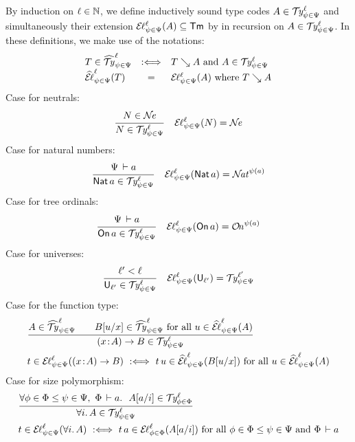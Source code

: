 \documentclass[acmsmall,screen]{acmart}\settopmatter{}
\renewcommand{\forallT}[2]{\forall #1.\,#2}
\begin{document}
By induction on $\ell \in \mathbb{N}$, we define inductively sound type codes
$A \in \mathcal{T}\kern-0.4ex\mathit{y}^{\ell}_{\psi\in\Psi}$ and simultaneously their extension
$\mathcal{E}\kern-0.2ex\ell^{\ell}_{\psi\in\Psi}(A) \subseteq \mathsf{Tm}$ by in recursion on
$A \in \mathcal{T}\kern-0.4ex\mathit{y}^{\ell}_{\psi\in\Psi}$.
In these definitions, we make use of the notations:
\[
\begin{array}{lcl}
  T \in \widehat{\mathcal{T}\kern-0.4ex\mathit{y}}^{\ell}_{\psi\in\Psi}
    & \mathrel{:\Longleftrightarrow} & T \searrow A \ \mbox{and}\  A \in \mathcal{T}\kern-0.4ex\mathit{y}^{\ell}_{\psi\in\Psi}
\\
  \widehat{\mathcal{E}\kern-0.2ex\ell}^{\ell}_{\psi\in\Psi}(T)
    & = & \mathcal{E}\kern-0.2ex\ell^{\ell}_{\psi\in\Psi}(A) \ \mbox{where}\  T \searrow A
\end{array}
\]
Case for neutrals:
\begin{align*}
  & \ru{N \in \NE}{N \in \TY \Psi \psi \ell}
  &
  \EL \Psi \psi \ell N = \NE
\end{align*}
Case for natural numbers:
\begin{align*}
  & \ru{\Psi \der a
      }{\Nat a \in \TY \Psi \psi \ell}
  & \EL \Psi \psi \ell {\Nat a}
    = \NAT^{\psi(a)}
\end{align*}
Case for tree ordinals:
\begin{align*}
  & \ru{\Psi \der a
      }{\On a \in \TY \Psi \psi \ell}
  & \EL \Psi \psi \ell {\On a}
    = \ON^{\psi(a)}
\end{align*}
Case for universes:
\begin{align*}
  & \ru{\ell' < \ell
      }{\Univ{\ell'} \in \TY \Psi \psi \ell}
  & \EL \Psi \psi \ell{\Univ{\ell'}}
    =
    \TY \Psi \psi {\ell'}
\end{align*}
Case for the function type:
\begin{align*}
  & \ru{A \in \TYhat \Psi \psi \ell \qquad
        \subst u x B \in \TYhat \Psi \psi \ell
        \mforall u \in \ELhat \Psi \psi \ell A
      }{\funT x A B \in \TY \Psi \psi \ell}
\\
  & t \in \EL \Psi \psi \ell {\funT x A B}
    \defas
    t\,u \in \ELhat \Psi \psi \ell {\subst u x B}
    \mforall u \in \ELhat \Psi \psi \ell A
\\
\end{align*}
Case for size polymorphism:
\begin{align*}
  & \ru{\forall \phi \in \Phi \leq \psi \in \Psi,\
        \Phi \der a.\ \
        \subst a i A \in \TY \Phi \phi \ell
      }{\forallT i A \in \TY \Psi \psi \ell}
\\
  & t \in \EL \Psi \psi \ell {\forallT i A}
    \defas
    t\,a \in \EL \Phi \phi \ell {\subst a i A}
    \mforall \phi \in \Phi \leq \psi \in \Psi
    \mand \Phi \der a
\end{align*}
\end{document}
